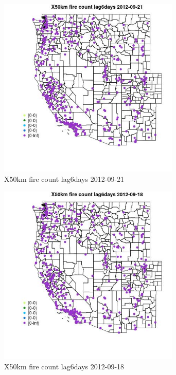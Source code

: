 \begin{figure} 
\centering  
\includegraphics[width=0.77\textwidth]{Code_Outputs/Report_ML_input_PM25_Step4_part_e_de_duplicated_aves_compiled_2019-05-14wNAs_MapObsX50km_fire_count_lag6days2012-09-21.jpg} 
\caption{\label{fig:Report_ML_input_PM25_Step4_part_e_de_duplicated_aves_compiled_2019-05-14wNAsMapObsX50km_fire_count_lag6days2012-09-21}X50km fire count lag6days 2012-09-21} 
\end{figure} 
 

\begin{figure} 
\centering  
\includegraphics[width=0.77\textwidth]{Code_Outputs/Report_ML_input_PM25_Step4_part_e_de_duplicated_aves_compiled_2019-05-14wNAs_MapObsX50km_fire_count_lag6days2012-09-18.jpg} 
\caption{\label{fig:Report_ML_input_PM25_Step4_part_e_de_duplicated_aves_compiled_2019-05-14wNAsMapObsX50km_fire_count_lag6days2012-09-18}X50km fire count lag6days 2012-09-18} 
\end{figure} 
 

